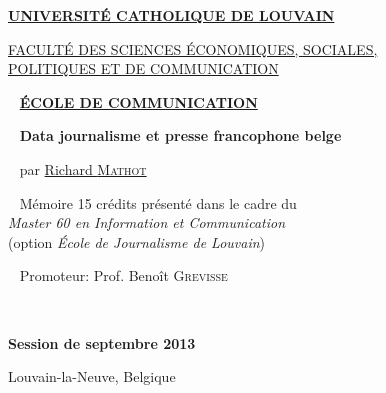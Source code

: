 
\begin{center}

\Large \href{http://www.uclouvain.be/}{\textbf{UNIVERSITÉ CATHOLIQUE DE LOUVAIN}}

\large \href{http://www.uclouvain.be/espo}{FACULTÉ DES SCIENCES ÉCONOMIQUES, SOCIALES, \\
POLITIQUES ET DE COMMUNICATION}

~ \vfill
\large \href{http://www.uclouvain.be/comu}{\textbf{ÉCOLE DE COMMUNICATION}}

~ \vfill
\huge\textbf{Data journalisme et presse francophone belge}%

~ \vfill
\large par \href{mailto:richard.mathot@gmail.com}{Richard \textsc{Mathot}}

~ \vfill
\normalsize Mémoire 15 crédits présenté dans le cadre du \\
\emph{Master 60 en Information et Communication}\\
(option \emph{École de Journalisme de Louvain})

\end{center}


~ \vfill
\hspace{6cm} Promoteur: Prof. Benoît \textsc{Grevisse}



~ \vfill

\begin{center}
\normalsize \textbf{Session de septembre 2013}

Louvain-la-Neuve, Belgique
\end{center}

\thispagestyle{empty}

